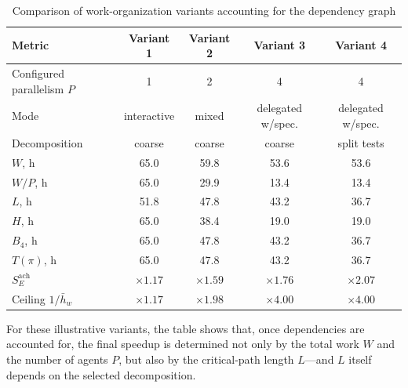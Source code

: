 
\begin{table}[ht!]
\centering
\caption{Comparison of work-organization variants accounting for the dependency graph}
\label{tab:practical-comparison}
\small
\begin{tabularx}{\textwidth}{Xcccc}
\toprule
Metric & Variant 1 & Variant 2 & Variant 3 & Variant 4 \\
\midrule
Configured parallelism $P$ & 1 & 2 & 4 & 4 \\
Mode & interactive & mixed & delegated w/spec. & delegated w/spec. \\
Decomposition & coarse & coarse & coarse & split tests \\
$W$, h & 65.0 & 59.8 & 53.6 & 53.6 \\
$W/P$, h & 65.0 & 29.9 & 13.4 & 13.4 \\
$L$, h & 51.8 & 47.8 & 43.2 & 36.7 \\
$H$, h & 65.0 & 38.4 & 19.0 & 19.0 \\
$B_4$, h & 65.0 & 47.8 & 43.2 & 36.7 \\
$T(\pi)$, h & 65.0 & 47.8 & 43.2 & 36.7 \\
$S_E^{\text{ach}}$ & $\times 1.17$ & $\times 1.59$ & $\times 1.76$ & $\times 2.07$ \\
Ceiling $1/\bar{h}_w$ & $\times 1.17$ & $\times 1.98$ & $\times 4.00$ & $\times 4.00$ \\
\bottomrule
\end{tabularx}
\end{table}

For these illustrative variants, the table shows that, once dependencies are
accounted for, the final speedup is determined not only by the total work $W$
and the number of agents $P$, but also by the critical-path length $L$---and
$L$ itself depends on the selected decomposition.


